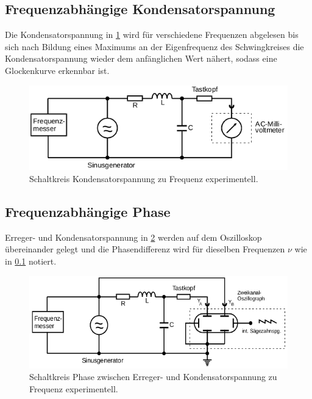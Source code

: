 \subsection{Frequenzabhängige Kondensatorspannung}
\label{sec:d3}
Die Kondensatorspannung in \ref{fig:d3} wird für verschiedene Frequenzen abgelesen bis sich nach
Bildung eines Maximums an der Eigenfrequenz des Schwingkreises die Kondensatorspannung wieder dem
anfänglichen Wert nähert, sodass eine Glockenkurve erkennbar ist.
\begin{figure}[H]
  \centering
  \includegraphics{content/images/d3.png}
  \caption{Schaltkreis Kondensatorspannung zu Frequenz experimentell\cite{anleitung}.}
  \label{fig:d3}
\end{figure}

\subsection{Frequenzabhängige Phase}
Erreger- und Kondensatorspannung in \ref{fig:d4} werden auf dem Oszilloskop übereinander gelegt
und die Phasendifferenz wird für dieselben Frequenzen $\nu$ wie in \ref{sec:d3} notiert.
\begin{figure}[H]
  \centering
  \includegraphics{content/images/d4.png}
  \caption{Schaltkreis Phase zwischen Erreger- und Kondensatorspannung zu Frequenz experimentell\cite{anleitung}.}
  \label{fig:d4}
\end{figure}
